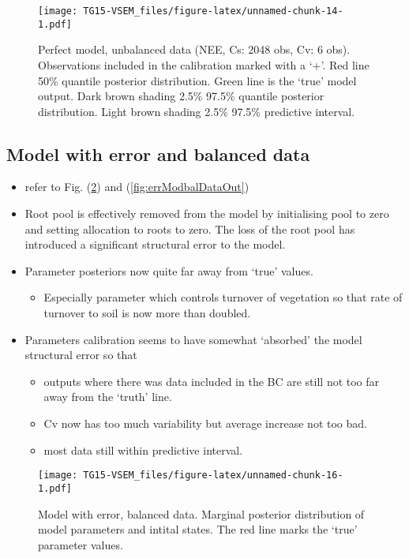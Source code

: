 \documentclass[]{article}
\providecommand{\tightlist}{%
  \setlength{\itemsep}{0pt}\setlength{\parskip}{0pt}}
\begin{document}
\begin{figure}
\centering
\texttt{[image: TG15-VSEM\_files/figure-latex/unnamed-chunk-14-1.pdf]}
\caption{\label{fig:perModunbalDataOut}Perfect model, unbalanced data
(NEE, Cs: 2048 obs, Cv: 6 obs). Observations included in the calibration
marked with a `+'. Red line 50\% quantile posterior distribution. Green
line is the `true' model output. Dark brown shading 2.5\% 97.5\%
quantile posterior distribution. Light brown shading 2.5\% 97.5\%
predictive interval.}
\end{figure}

\subsection{Model with error and balanced
data}\label{model-with-error-and-balanced-data}

\begin{itemize}
\tightlist
\item
  refer to Fig. (\ref{fig:errModbalDataPar}) and
  (\ref{fig:errModbalDataOut})
\item
  Root pool is effectively removed from the model by initialising pool
  to zero and setting allocation to roots to zero. The loss of the root
  pool has introduced a significant structural error to the model.
\item
  Parameter posteriors now quite far away from `true' values.

  \begin{itemize}
  \tightlist
  \item
    Especially parameter which controls turnover of vegetation so that
    rate of turnover to soil is now more than doubled.
  \end{itemize}
\item
  Parameters calibration seems to have somewhat `absorbed' the model
  structural error so that

  \begin{itemize}
  \tightlist
  \item
    outputs where there was data included in the BC are still not too
    far away from the `truth' line.
  \item
    Cv now has too much variability but average increase not too bad.
  \item
    most data still within predictive interval.
  \end{itemize}
\end{itemize}

\begin{figure}
\centering
\texttt{[image: TG15-VSEM\_files/figure-latex/unnamed-chunk-16-1.pdf]}
\caption{\label{fig:errModbalDataPar}Model with error, balanced data.
Marginal posterior distribution of model parameters and intital states.
The red line marks the `true' parameter values.}
\end{figure}
\end{document}
